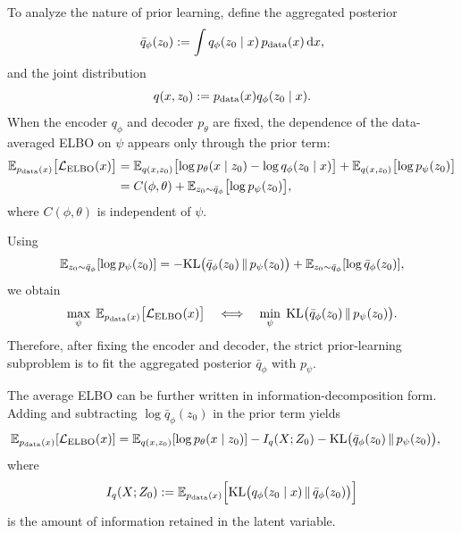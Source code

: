 To analyze the nature of prior learning, define the aggregated posterior
\begin{equation}
\bar q_{\phi}(z_0)
:=
\int q_{\phi}(z_0\mid x)\,p_{\mathrm{data}}(x)\,\mathrm{d} x,
\label{eq:app_agg_posterior}
\end{equation}
and the joint distribution
\begin{equation}
q(x,z_0):=p_{\mathrm{data}}(x)q_{\phi}(z_0\mid x).
\label{eq:app_joint_qxz}
\end{equation}
When the encoder $q_{\phi}$ and decoder $p_{\theta}$ are fixed, the dependence of the data-averaged ELBO on $\psi$ appears only through the prior term:
\begin{align}
\mathbb{E}_{p_{\mathrm{data}}(x)}\bigl[\mathcal{L}_{\mathrm{ELBO}}(x)\bigr]
&=
\mathbb{E}_{q(x,z_0)}\bigl[\log p_{\theta}(x\mid z_0)-\log q_{\phi}(z_0\mid x)\bigr]
+\mathbb{E}_{q(x,z_0)}\bigl[\log p_{\psi}(z_0)\bigr] \\
&=
C(\phi,\theta)
+
\mathbb{E}_{z_0\sim \bar q_{\phi}}\bigl[\log p_{\psi}(z_0)\bigr],
\label{eq:app_avg_elbo_prior_part}
\end{align}
where $C(\phi,\theta)$ is independent of $\psi$.

Using
\[
\mathbb{E}_{z_0\sim \bar q_{\phi}}[\log p_{\psi}(z_0)]
=
-\mathrm{KL}\bigl(\bar q_{\phi}(z_0)\,\|\,p_{\psi}(z_0)\bigr)
+
\mathbb{E}_{z_0\sim \bar q_{\phi}}[\log \bar q_{\phi}(z_0)],
\]
we obtain
\begin{equation}
\max_{\psi}\;\mathbb{E}_{p_{\mathrm{data}}(x)}\bigl[\mathcal{L}_{\mathrm{ELBO}}(x)\bigr]
\quad\Longleftrightarrow\quad
\min_{\psi}\;\mathrm{KL}\bigl(\bar q_{\phi}(z_0)\,\|\,p_{\psi}(z_0)\bigr).
\label{eq:app_prior_matching_problem}
\end{equation}
Therefore, after fixing the encoder and decoder, the strict prior-learning subproblem is to fit the aggregated posterior $\bar q_{\phi}$ with $p_{\psi}$.

The average ELBO can be further written in information-decomposition form. Adding and subtracting $\log \bar q_{\phi}(z_0)$ in the prior term yields
\begin{align}
\mathbb{E}_{p_{\mathrm{data}}(x)}[\mathcal{L}_{\mathrm{ELBO}}(x)]
&=
\mathbb{E}_{q(x,z_0)}[\log p_{\theta}(x\mid z_0)]
- I_q(X;Z_0)
- \mathrm{KL}\bigl(\bar q_{\phi}(z_0)\,\|\,p_{\psi}(z_0)\bigr),
\label{eq:app_avg_elbo_decomp}
\end{align}
where
\begin{equation}
I_q(X;Z_0)
:=
\mathbb{E}_{p_{\mathrm{data}}(x)}\Bigl[\mathrm{KL}\bigl(q_{\phi}(z_0\mid x)\,\|\,\bar q_{\phi}(z_0)\bigr)\Bigr]
\label{eq:app_mutual_info}
\end{equation}
is the amount of information retained in the latent variable.

